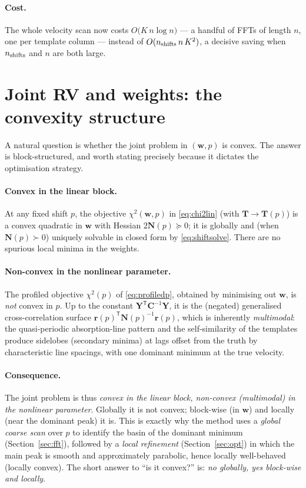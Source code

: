 \documentclass[11pt]{article}
\newcommand{\T}{\mathsf{T}}                    %
\begin{document}
\paragraph{Cost.}
The whole velocity scan now costs $O\!\big(K\,n\log n\big)$ --- a handful of FFTs
of length $n$, one per template column --- instead of
$O(n_{\rm shifts}\,n\,K^2)$, a decisive saving when $n_{\rm shifts}$ and $n$ are
both large.

\section{Joint RV and weights: the convexity structure}
\label{sec:convexity}
A natural question is whether the joint problem in $(\mathbf{w},p)$ is convex. The
answer is block-structured, and worth stating precisely because it dictates the
optimisation strategy.

\paragraph{Convex in the linear block.}
At any fixed shift $p$, the objective $\chi^2(\mathbf{w},p)$ in \eqref{eq:chi2lin}
(with $\mathbf{T}\!\to\!\mathbf{T}(p)$) is a convex quadratic in $\mathbf{w}$ with
Hessian $2\mathbf{N}(p)\succeq 0$; it is globally and (when $\mathbf{N}(p)\succ0$)
uniquely solvable in closed form by \eqref{eq:shiftsolve}. There are no spurious
local minima in the weights.

\paragraph{Non-convex in the nonlinear parameter.}
The profiled objective $\chi^2(p)$ of \eqref{eq:profiledp}, obtained by
minimising out $\mathbf{w}$, is \emph{not} convex in $p$. Up to the constant
$\mathbf{Y}^\T\mathbf{C}^{-1}\mathbf{Y}$, it is the (negated) generalised
cross-correlation surface $\mathbf{r}(p)^\T\mathbf{N}(p)^{-1}\mathbf{r}(p)$, which
is inherently \emph{multimodal}: the quasi-periodic absorption-line pattern and
the self-similarity of the templates produce sidelobes (secondary minima) at lags
offset from the truth by characteristic line spacings, with one dominant minimum
at the true velocity.

\paragraph{Consequence.}
The joint problem is thus \emph{convex in the linear block,
non-convex (multimodal) in the nonlinear parameter}. Globally it is not convex;
block-wise (in $\mathbf{w}$) and locally (near the dominant peak) it is. This is
exactly why the method uses a \emph{global coarse scan} over $p$ to identify the
basin of the dominant minimum (Section~\ref{sec:fft}), followed by a
\emph{local refinement} (Section~\ref{sec:opt}) in which the main peak is smooth
and approximately parabolic, hence locally well-behaved (locally convex). The
short answer to ``is it convex?'' is: \emph{no globally, yes block-wise and
locally}.
\end{document}
